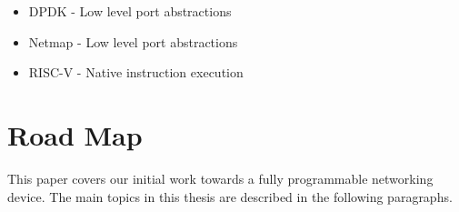 \begin{itemize}
  \item DPDK - Low level port abstractions
  \item Netmap - Low level port abstractions
  \item RISC-V - Native instruction execution
\end{itemize}

%
%

\section{Road Map}
\label{intro:map}
This paper covers our initial work towards a fully programmable networking
device. The main topics in this thesis are described in the following
paragraphs.

